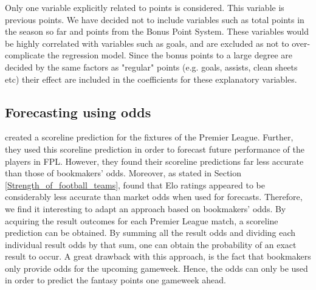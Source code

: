 Only one variable explicitly related to points is considered. This variable is previous points. We have decided not to include variables such as total points in the season so far and points from the Bonus Point System. These variables would be highly correlated with variables such as goals, and are excluded as not to over-complicate the regression model. Since the bonus points to a large degree are decided by the same factors as "regular" points (e.g. goals, assists, clean sheets etc) their effect are included in the coefficients for these explanatory variables. 


\subsection{Forecasting using odds}
\cite{Gupta} created a scoreline prediction for the fixtures of the Premier League. Further, they used this scoreline prediction in order to forecast future performance of the players in FPL. However, they found their scoreline predictions far less accurate than those of bookmakers' odds. Moreover, as stated in Section \ref{Strength_of_football_teams}, \cite{Hvattum} found that Elo ratings appeared to be considerably less accurate than market odds when used for forecasts. Therefore, we find it interesting to adapt an approach based on bookmakers' odds. By acquiring the result outcomes for each Premier League match, a scoreline prediction can be obtained. By summing all the result odds and dividing each individual result odds by that sum, one can obtain the probability of an exact result to occur. A great drawback with this approach, is the fact that bookmakers only provide odds for the upcoming gameweek. Hence, the odds can only be used in order to predict the fantasy points one gameweek ahead.  

\newpar

\newpar



